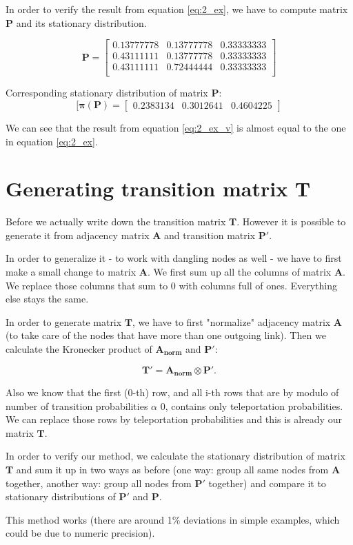 \documentclass{article}
\begin{document}
In order to verify the result from equation \ref{eq:2_ex}, we have to compute matrix $\mathbf{P}$ and its stationary distribution.

\[\mathbf{P}=
\begin{bmatrix}
    0.13777778 &  0.13777778 &  0.33333333 \\
    0.43111111 & 0.13777778 & 0.33333333  \\
    0.43111111 & 0.72444444 & 0.33333333 \\
\end{bmatrix}
\]

Corresponding stationary distribution of matrix $\mathbf{P}$:
\begin{equation}
[\mathbf{\pi(P)} = 
\begin{bmatrix}
0.2383134 & 0.3012641 & 0.4604225
\end{bmatrix}
\label{eq:2_ex_v}
\end{equation}

We can see that the result from equation \ref{eq:2_ex_v} is almost equal to the one in equation \ref{eq:2_ex}.


\section{Generating transition matrix T}
Before we actually write down the transition matrix $\mathbf{T}$. However it is possible to generate it from adjacency matrix $\mathbf{A}$ and transition matrix $\mathbf{P'}$. 

In order to generalize it - to work with dangling nodes as well - we have to first make a small change to matrix $\mathbf{A}$. We first sum up all the columns of matrix $\mathbf{A}$. We replace those columns that sum to 0 with columns full of ones. Everything else stays the same.

In order to generate matrix $\mathbf{T}$, we have to first "normalize" adjacency matrix $\mathbf{A}$ (to take care of the nodes that have more than one outgoing link). Then we calculate the Kronecker product of $\mathbf{A_{norm}}$ and $\mathbf{P'}$:

$$\mathbf{T'} = \mathbf{A_{norm}} \otimes \mathbf{P'}.$$

Also we know that the first (0-th) row, and all i-th rows that are by modulo of number of transition probabilities $\alpha$ 0, contains only teleportation probabilities. We can replace those rows by teleportation probabilities and this is already our matrix $\mathbf{T}$.  

In order to verify our method, we calculate the stationary distribution of matrix $\mathbf{T}$ and sum it up in two ways as before (one way: group all same nodes from $\mathbf{A}$ together, another way: group all nodes from $\mathbf{P'}$ together) and compare it to stationary distributions of $\mathbf{P'}$ and $\mathbf{P}$.

This method works (there are around 1\% deviations in simple examples, which could be due to numeric precision). 
\end{document}
